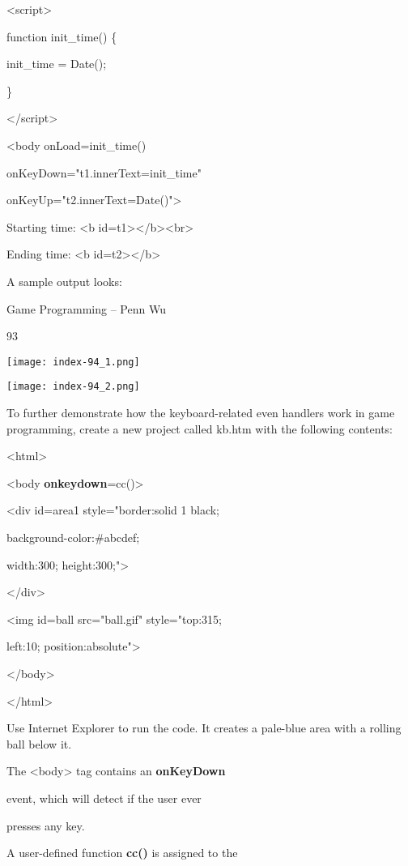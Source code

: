 \documentclass[
]{article}
\begin{document}
\textless script\textgreater{}

function init\_time() \{

init\_time = Date();

\}

\textless/script\textgreater{}

\textless body onLoad=init\_time()

onKeyDown="t1.innerText=init\_time"

onKeyUp="t2.innerText=Date()"\textgreater{}

Starting time: \textless b
id=t1\textgreater\textless/b\textgreater\textless br\textgreater{}

Ending time: \textless b id=t2\textgreater\textless/b\textgreater{}

A sample output looks:

Game Programming -- Penn Wu

93

\protect\hypertarget{index_split_007.htmlux5cux23p94}{}{}\texttt{[image: index-94\_1.png]}

\texttt{[image: index-94\_2.png]}

To further demonstrate how the keyboard-related even handlers work in
game programming, create a new project called kb.htm with the following
contents:

\textless html\textgreater{}

\textless body \textbf{onkeydown}=cc()\textgreater{}

\textless div id=area1 style="border:solid 1 black;

background-color:\#abcdef;

width:300; height:300;"\textgreater{}

\textless/div\textgreater{}

\textless img id=ball src="ball.gif" style="top:315;

left:10; position:absolute"\textgreater{}

\textless/body\textgreater{}

\textless/html\textgreater{}

Use Internet Explorer to run the code. It creates a pale-blue area with
a rolling ball below it.

The \textless body\textgreater{} tag contains an \textbf{onKeyDown}

event, which will detect if the user ever

presses any key.

A user-defined function \textbf{cc()} is assigned to the
\end{document}
